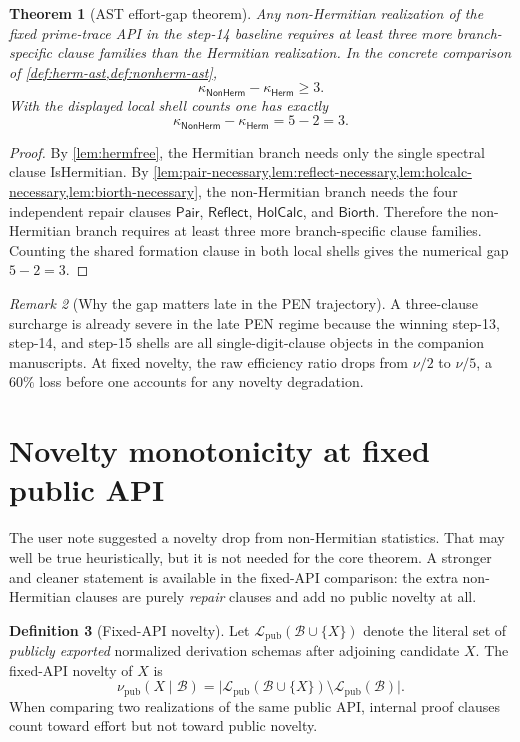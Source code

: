 \documentclass[11pt,a4paper]{article}
\theoremstyle{plain}
\newtheorem{theorem}{Theorem}[section]
\theoremstyle{definition}
\newtheorem{definition}[theorem]{Definition}
\theoremstyle{remark}
\newtheorem{remark}[theorem]{Remark}
\newcommand{\Bcal}{\mathcal{B}}
\newcommand{\Lcal}{\mathcal{L}}
\newcommand{\effort}{\kappa}
\newcommand{\novelty}{\nu}
\newcommand{\pair}{\ensuremath{\mathsf{Pair}}}
\newcommand{\reflect}{\ensuremath{\mathsf{Reflect}}}
\newcommand{\holcalc}{\ensuremath{\mathsf{HolCalc}}}
\newcommand{\biorth}{\ensuremath{\mathsf{Biorth}}}
\newcommand{\herm}{\ensuremath{\mathsf{Herm}}}
\newcommand{\nonherm}{\ensuremath{\mathsf{NonHerm}}}
\begin{document}
\begin{theorem}[AST effort-gap theorem]
\label{thm:effortgap}
Any non-Hermitian realization of the fixed prime-trace API in the step-14 baseline requires at least three more branch-specific clause families than the Hermitian realization. In the concrete comparison of \cref{def:herm-ast,def:nonherm-ast},
\[
\effort_{\nonherm}-\effort_{\herm}\ge 3.
\]
With the displayed local shell counts one has exactly
\[
\effort_{\nonherm}-\effort_{\herm}=5-2=3.
\]
\end{theorem}

\begin{proof}
By \cref{lem:hermfree}, the Hermitian branch needs only the single spectral clause \textsf{IsHermitian}. By \cref{lem:pair-necessary,lem:reflect-necessary,lem:holcalc-necessary,lem:biorth-necessary}, the non-Hermitian branch needs the four independent repair clauses \pair, \reflect, \holcalc, and \biorth. Therefore the non-Hermitian branch requires at least three more branch-specific clause families. Counting the shared formation clause in both local shells gives the numerical gap $5-2=3$.
\end{proof}

\begin{remark}[Why the gap matters late in the PEN trajectory]
A three-clause surcharge is already severe in the late PEN regime because the winning step-13, step-14, and step-15 shells are all single-digit-clause objects in the companion manuscripts. At fixed novelty, the raw efficiency ratio drops from $\nu/2$ to $\nu/5$, a $60\%$ loss before one accounts for any novelty degradation.
\end{remark}

\section{Novelty monotonicity at fixed public API}

The user note suggested a novelty drop from non-Hermitian statistics. That may well be true heuristically, but it is not needed for the core theorem. A stronger and cleaner statement is available in the fixed-API comparison: the extra non-Hermitian clauses are purely \emph{repair} clauses and add no public novelty at all.

\begin{definition}[Fixed-API novelty]
\label{def:fixedapinu}
Let $\Lcal_{\mathrm{pub}}(\Bcal\cup\{X\})$ denote the literal set of \emph{publicly exported} normalized derivation schemas after adjoining candidate $X$. The fixed-API novelty of $X$ is
\[
\novelty_{\mathrm{pub}}(X\mid\Bcal)=\bigl|\Lcal_{\mathrm{pub}}(\Bcal\cup\{X\})\setminus \Lcal_{\mathrm{pub}}(\Bcal)\bigr|.
\]
When comparing two realizations of the same public API, internal proof clauses count toward effort but not toward public novelty.
\end{definition}
\end{document}

